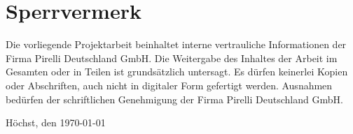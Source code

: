 \chapter*{Sperrvermerk}
Die vorliegende Projektarbeit beinhaltet interne vertrauliche Informationen der Firma Pirelli Deutschland GmbH.
Die Weitergabe des Inhaltes der Arbeit im Gesamten oder in Teilen ist grundsätzlich untersagt. Es dürfen keinerlei Kopien oder Abschriften, auch nicht in digitaler Form gefertigt werden. Ausnahmen bedürfen der schriftlichen Genehmigung der Firma Pirelli Deutschland GmbH.

\bigskip
\noindent
Höchst, den \today \\